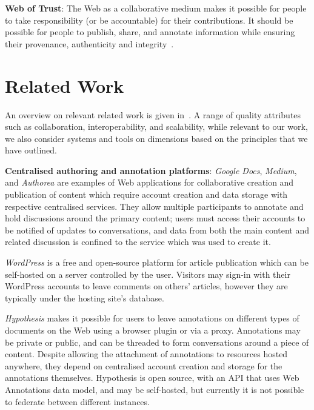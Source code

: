 \documentclass[a4paper]{llncs}
\begin{document}
\par \textbf{Web of Trust}: The Web as a collaborative medium makes it possible for people to take responsibility (or be accountable) for their contributions. It should be possible for people to publish, share, and annotate information while ensuring their provenance, authenticity and integrity~\cite{ref-5,ref-6,ref-7}.


\section{Related Work}
\label{related-work}
                          
\par An overview on relevant related work is given in~\cite{ref-8}. A range of quality attributes such as collaboration, interoperability, and scalability, while relevant to our work, we also consider systems and tools on dimensions based on the principles that we have outlined.

                            
\par 
                                \textbf{Centralised authoring and annotation platforms}:
                                \textit{Google Docs}, \textit{Medium}, and \textit{Authorea} are examples of Web applications for collaborative creation and publication of content which require account creation and data storage with respective centralised services. They allow multiple participants to annotate and hold discussions around the primary content; users must access their accounts to be notified of updates to conversations, and data from both the main content and related discussion is confined to the service which was used to create it.

                                \textit{WordPress} is a free and open-source platform for article publication which can be self-hosted on a server controlled by the user. Visitors may sign-in with their WordPress accounts to leave comments on others’ articles, however they are typically under the hosting site’s database.

                                \textit{Hypothesis} makes it possible for users to leave annotations on different types of documents on the Web using a browser plugin or via a proxy. Annotations may be private or public, and can be threaded to form conversations around a piece of content. Despite allowing the attachment of annotations to resources hosted anywhere, they depend on centralised account creation and storage for the annotations themselves. Hypothesis is open source, with an API that uses Web Annotations data model, and may be self-hosted, but currently it is not possible to federate between different instances.
\end{document}
